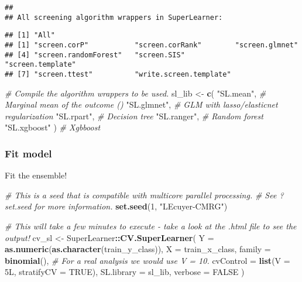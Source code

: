 \documentclass[
]{book}
\newenvironment{Shaded}{\begin{snugshade}}{\end{snugshade}}
\newcommand{\CommentTok}[1]{\textcolor[rgb]{0.56,0.35,0.01}{\textit{#1}}}
\newcommand{\DataTypeTok}[1]{\textcolor[rgb]{0.13,0.29,0.53}{#1}}
\newcommand{\DecValTok}[1]{\textcolor[rgb]{0.00,0.00,0.81}{#1}}
\newcommand{\KeywordTok}[1]{\textcolor[rgb]{0.13,0.29,0.53}{\textbf{#1}}}
\newcommand{\NormalTok}[1]{#1}
\newcommand{\OperatorTok}[1]{\textcolor[rgb]{0.81,0.36,0.00}{\textbf{#1}}}
\newcommand{\OtherTok}[1]{\textcolor[rgb]{0.56,0.35,0.01}{#1}}
\newcommand{\StringTok}[1]{\textcolor[rgb]{0.31,0.60,0.02}{#1}}
\begin{document}
\begin{verbatim}
## 
## All screening algorithm wrappers in SuperLearner:
\end{verbatim}

\begin{verbatim}
## [1] "All"
## [1] "screen.corP"           "screen.corRank"        "screen.glmnet"        
## [4] "screen.randomForest"   "screen.SIS"            "screen.template"      
## [7] "screen.ttest"          "write.screen.template"
\end{verbatim}

\begin{Shaded}
\begin{Highlighting}[]
\CommentTok{\# Compile the algorithm wrappers to be used.}
\NormalTok{sl\_lib \textless{}{-}}\StringTok{ }\KeywordTok{c}\NormalTok{(}
  \StringTok{"SL.mean"}\NormalTok{, }\CommentTok{\# Marginal mean of the outcome ()}
  \StringTok{"SL.glmnet"}\NormalTok{, }\CommentTok{\# GLM with lasso/elasticnet regularization}
  \StringTok{"SL.rpart"}\NormalTok{, }\CommentTok{\# Decision tree}
  \StringTok{"SL.ranger"}\NormalTok{, }\CommentTok{\# Random forest}
  \StringTok{"SL.xgboost"}
\NormalTok{) }\CommentTok{\# Xgbboost}
\end{Highlighting}
\end{Shaded}

\hypertarget{fit-model}{%
\subsubsection{Fit model}\label{fit-model}}

Fit the ensemble!

\begin{Shaded}
\begin{Highlighting}[]
\CommentTok{\# This is a seed that is compatible with multicore parallel processing.}
\CommentTok{\# See ?set.seed for more information.}
\KeywordTok{set.seed}\NormalTok{(}\DecValTok{1}\NormalTok{, }\StringTok{"L\textquotesingle{}Ecuyer{-}CMRG"}\NormalTok{)}

\CommentTok{\# This will take a few minutes to execute {-} take a look at the .html file to see the output!}
\NormalTok{cv\_sl \textless{}{-}}\StringTok{ }\NormalTok{SuperLearner}\OperatorTok{::}\KeywordTok{CV.SuperLearner}\NormalTok{(}
  \DataTypeTok{Y =} \KeywordTok{as.numeric}\NormalTok{(}\KeywordTok{as.character}\NormalTok{(train\_y\_class)),}
  \DataTypeTok{X =}\NormalTok{ train\_x\_class,}
  \DataTypeTok{family =} \KeywordTok{binomial}\NormalTok{(),}
  \CommentTok{\# For a real analysis we would use V = 10.}
  \DataTypeTok{cvControl =} \KeywordTok{list}\NormalTok{(}\DataTypeTok{V =}\NormalTok{ 5L, }\DataTypeTok{stratifyCV =} \OtherTok{TRUE}\NormalTok{),}
  \DataTypeTok{SL.library =}\NormalTok{ sl\_lib,}
  \DataTypeTok{verbose =} \OtherTok{FALSE}
\NormalTok{)}
\end{Highlighting}
\end{Shaded}
\end{document}
